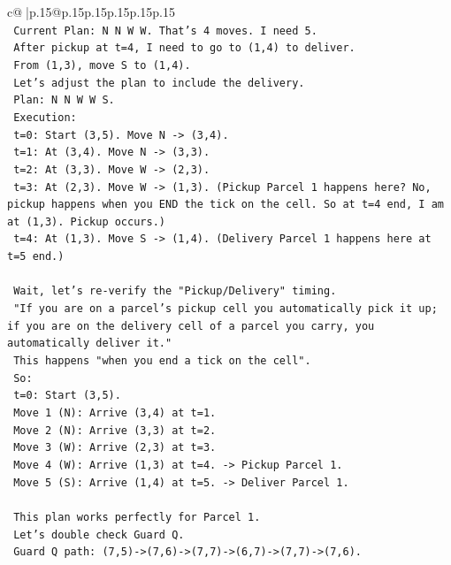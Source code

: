 \documentclass{article}
\begin{document}
{\begin{supertabular}{c@{$\;$}|p{.15\linewidth}@{}p{.15\linewidth}p{.15\linewidth}p{.15\linewidth}p{.15\linewidth}p{.15\linewidth}}
{{{\\ 
\texttt{   Current Plan: N N W W. That's 4 moves. I need 5.} \\
\texttt{   After pickup at t=4, I need to go to (1,4) to deliver.} \\
\texttt{   From (1,3), move S to (1,4).} \\
\texttt{   Let's adjust the plan to include the delivery.} \\
\texttt{   Plan: N N W W S.} \\
\texttt{   Execution:} \\
\texttt{   t=0: Start (3,5). Move N {-}> (3,4).} \\
\texttt{   t=1: At (3,4). Move N {-}> (3,3).} \\
\texttt{   t=2: At (3,3). Move W {-}> (2,3).} \\
\texttt{   t=3: At (2,3). Move W {-}> (1,3). (Pickup Parcel 1 happens here? No, pickup happens when you END the tick on the cell. So at t=4 end, I am at (1,3). Pickup occurs.)} \\
\texttt{   t=4: At (1,3). Move S {-}> (1,4). (Delivery Parcel 1 happens here at t=5 end.)} \\
\\ 
\texttt{   Wait, let's re{-}verify the "Pickup/Delivery" timing.} \\
\texttt{   "If you are on a parcel's pickup cell you automatically pick it up; if you are on the delivery cell of a parcel you carry, you automatically deliver it."} \\
\texttt{   This happens "when you end a tick on the cell".} \\
\texttt{   So:} \\
\texttt{   t=0: Start (3,5).} \\
\texttt{   Move 1 (N): Arrive (3,4) at t=1.} \\
\texttt{   Move 2 (N): Arrive (3,3) at t=2.} \\
\texttt{   Move 3 (W): Arrive (2,3) at t=3.} \\
\texttt{   Move 4 (W): Arrive (1,3) at t=4. {-}> Pickup Parcel 1.} \\
\texttt{   Move 5 (S): Arrive (1,4) at t=5. {-}> Deliver Parcel 1.} \\
\\ 
\texttt{   This plan works perfectly for Parcel 1.} \\
\texttt{   Let's double check Guard Q.} \\
\texttt{   Guard Q path: (7,5){-}>(7,6){-}>(7,7){-}>(6,7){-}>(7,7){-}>(7,6).} \\
}}}
\end{supertabular}}
\end{document}
